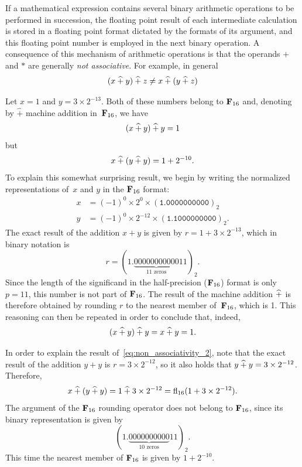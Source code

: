 If a mathematical expression contains several binary arithmetic operations to be performed in succession,
the floating point result of each intermediate calculation is stored in a floating point format dictated by the formats of its argument,
and this floating point number is employed in the next binary operation.
A consequence of this mechanism of arithmetic operations is that the operands $+$ and $*$ are generally \emph{not associative}.
For example, in general
\[
    (x \mathbin{\widehat +} y) \mathbin{\widehat +}  z \neq x \mathbin{\widehat +} (y \mathbin{\widehat +} z)
\]
\begin{example}
    Let $x = 1$ and $y = 3 \times 2^{-13}$.
    Both of these numbers belong to $\mathbf F_{16}$ and,
    denoting by $\widehat +$ machine addition in~$\mathbf F_{16}$,
    we have
    \begin{equation}
        \label{eq:non_associativity_1}
        (x \mathbin{\widehat +} y) \mathbin{\widehat +} y = 1
    \end{equation}
    but
    \begin{equation}
        \label{eq:non_associativity_2}
        x \mathbin{\widehat +} (y \mathbin{\widehat +} y) = 1 + 2^{-10}.
    \end{equation}
    To explain this somewhat surprising result,
    we begin by writing the normalized representations of~$x$ and $y$ in the $\mathbf F_{16}$ format:
    \begin{align*}
        x &= (-1)^0 \times 2^0 \times (\texttt{1.0000000000})_2 \\
        y &= (-1)^0 \times 2^{-12} \times (\texttt{1.1000000000})_2.
    \end{align*}
    The exact result of the addition $x + y$ is given by $r = 1 + 3 \times 2^{-13}$,
    which in binary notation is
    \[
        r = (1.\underbrace{00000000000}_{\text{11 zeros}}11)_2.
    \]
    Since the length of the significand in the half-precision ($\mathbf F_{16}$) format is only $p = 11$,
    this number is not part of $\mathbf F_{16}$.
    The result of the machine addition $\mathbin{\widehat +}$ is therefore obtained by rounding $r$ to the nearest member of~$\mathbf F_{16}$,
    which is 1.
    This reasoning can then be repeated in order to conclude that, indeed,
    \[
        (x \mathbin{\widehat +} y) \mathbin{\widehat +} y = x \mathbin{\widehat +} y = 1.
    \]

    In order to explain the result of~\eqref{eq:non_associativity_2},
    note that the exact result of the addition $y + y$ is $r = 3 \times 2^{-12}$,
    so it also holds that $y \mathbin{\widehat +} y = 3 \times 2^{-12}$.
    Therefore,
    \[
        x \mathbin{\widehat +} (y \mathbin{\widehat +} y) = 1 \mathbin{\widehat +} 3 \times 2^{-12} = {\rm fl}_{16} (1 + 3 \times 2^{-12}).
    \]
    The argument of the $\mathbf F_{16}$ rounding operator does not belong to $\mathbf F_{16}$,
    since its binary representation is given by
    \[
        (1.\underbrace{0000000000}_{\text{10 zeros}}11)_2.
    \]
    This time the nearest member of $\mathbf F_{16}$ is given by $1 + 2^{-10}$.
\end{example}


